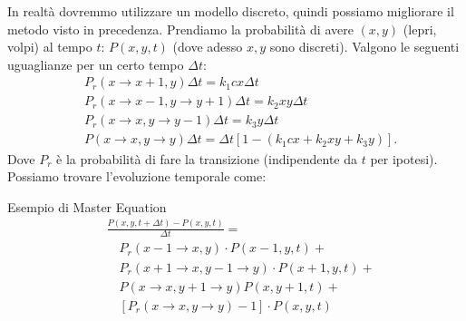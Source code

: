 In realtà dovremmo utilizzare un modello discreto, quindi possiamo migliorare il metodo visto in precedenza. Prendiamo la probabilità di avere $(x,y)$ (lepri, volpi) al tempo $t$: $P(x,y,t)$ (dove adesso $x,y$ sono discreti). Valgono le seguenti uguaglianze per un certo tempo $\Delta t$:
\[\begin{aligned}
    &P_r(x\to x+1, y) \Delta t = k_1 c x \Delta t\\
    &P_r(x\to x-1, y \to y+1) \Delta t  = k_2xy\Delta t\\
    &P_r(x\to x,y\to y-1) \Delta t = k_3 y \Delta t\\
    &P(x\to x,y\to y) \Delta t = \Delta t \left[  1 - \left(k_1cx+ k_2xy + k_3 y\right)\right]
.\end{aligned}\]
Dove $P_r$ è la probabilità di fare la transizione (indipendente da $t$ per ipotesi).
Possiamo trovare l'evoluzione temporale come:
\begin{redbox}{Esempio di Master Equation}
    \begin{equation}
        \begin{aligned}
	    &\frac{P(x,y,t+\Delta  t) - P(x,y,t)}{\Delta  t}  =\\
	    & \quad P_r(x-1\to x, y) \cdot P(x-1,y,t) +\\
	    & \quad P_r(x+1\to x, y-1\to y) \cdot P(x+1,y,t) + \\
	    & \quad P(x\to x, y+1\to y) P(x,y+1,t) + \\
	    & \quad \left[P_r(x\to x, y\to y) - 1\right]\cdot P(x,y,t) 
        \end{aligned}
    \end{equation}
\end{redbox}
